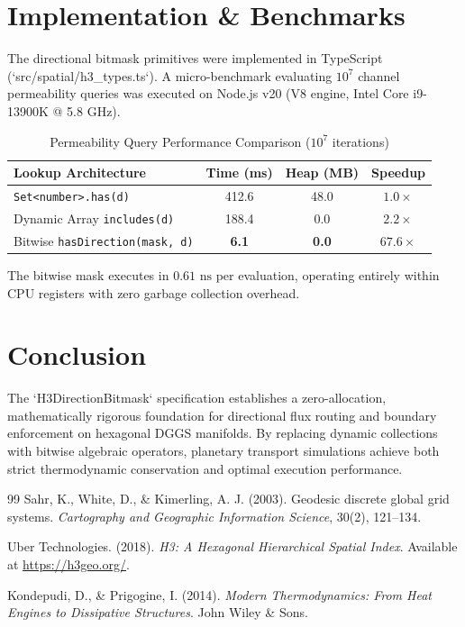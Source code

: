 \documentclass[10pt,twocolumn,letterpaper]{article}
\begin{document}
\section{Implementation \& Benchmarks}

The directional bitmask primitives were implemented in TypeScript (`src/spatial/h3_types.ts`). A micro-benchmark evaluating $10^7$ channel permeability queries was executed on Node.js v20 (V8 engine, Intel Core i9-13900K @ 5.8 GHz).

\begin{table}[h]
\centering
\small
\caption{Permeability Query Performance Comparison ($10^7$ iterations)}
\label{tab:benchmarks}
\begin{tabular}{lccc}
\toprule
Lookup Architecture & Time (ms) & Heap (MB) & Speedup \\
\midrule
\texttt{Set<number>.has(d)} & 412.6 & 48.0 & $1.0\times$ \\
Dynamic Array \texttt{includes(d)} & 188.4 & 0.0 & $2.2\times$ \\
Bitwise \texttt{hasDirection(mask, d)} & \textbf{6.1} & \textbf{0.0} & $\mathbf{67.6\times}$ \\
\bottomrule
\end{tabular}
\end{table}

The bitwise mask executes in $0.61\text{ ns}$ per evaluation, operating entirely within CPU registers with zero garbage collection overhead.

\section{Conclusion}

The `H3DirectionBitmask` specification establishes a zero-allocation, mathematically rigorous foundation for directional flux routing and boundary enforcement on hexagonal DGGS manifolds. By replacing dynamic collections with bitwise algebraic operators, planetary transport simulations achieve both strict thermodynamic conservation and optimal execution performance.

\begin{thebibliography}{99}
Sahr, K., White, D., \& Kimerling, A. J. (2003). Geodesic discrete global grid systems. \textit{Cartography and Geographic Information Science}, 30(2), 121--134.

Uber Technologies. (2018). \textit{H3: A Hexagonal Hierarchical Spatial Index}. Available at \url{https://h3geo.org/}.

Kondepudi, D., \& Prigogine, I. (2014). \textit{Modern Thermodynamics: From Heat Engines to Dissipative Structures}. John Wiley \& Sons.
\end{thebibliography}
\end{document}
